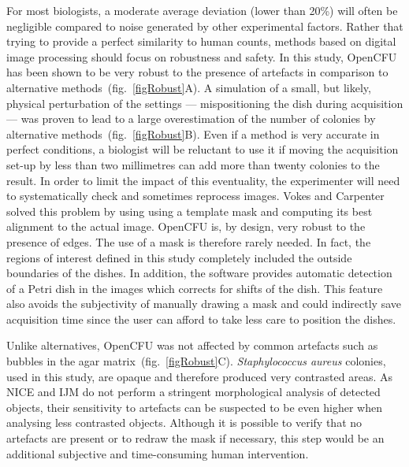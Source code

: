 \documentclass[10pt]{article}
\newcommand{\sa}{\emph{Staphylococcus aureus}}
\newcommand{\IJM}{IJM}
\begin{document}
For most biologists, a moderate average deviation (lower than 20\%) will often be
negligible compared to noise generated by other experimental factors.
Rather that trying to provide a perfect similarity to human counts, methods
based on digital image processing should focus on robustness and safety.
In this study, OpenCFU has been shown to be very robust to the presence of
artefacts in comparison to alternative methods~(fig.~\ref{figRobust}A). A
simulation of a small, but likely, physical perturbation of the settings ---
mispositioning the dish during acquisition --- was proven to lead to a large
overestimation of the number of colonies by alternative
methods~(fig.~\ref{figRobust}B).
Even if a method is very accurate in perfect conditions, a biologist will be
reluctant to use it if moving the acquisition set-up by less than two
millimetres can add more than twenty colonies to the result.
In order to limit the impact of this eventuality, the experimenter will need to
systematically check and sometimes reprocess images.
Vokes and Carpenter \cite{vokes_using_2008} solved this problem by using using a
template mask and computing its best alignment to the actual image.
OpenCFU is, by design, very robust to the presence of edges. The use of a mask is
therefore rarely needed. In fact, the regions of interest defined in this study
completely included the outside boundaries of the dishes.
In addition, the software provides automatic detection of a Petri dish
in
the images which corrects for shifts of the dish. This feature also avoids 
the
subjectivity of manually drawing a mask and could indirectly save acquisition
time since the user can afford to take less care to position the dishes.

Unlike alternatives, OpenCFU was not affected by common artefacts such as bubbles
 in the agar matrix~(fig.~\ref{figRobust}C).  
 \sa{} colonies, used in this study, are opaque and therefore produced very
contrasted areas. As NICE and \IJM{} do not perform a stringent
morphological analysis of detected objects, their sensitivity to artefacts can be
suspected to be even higher when analysing less contrasted objects.
Although 
it is possible to verify that no artefacts are present or to redraw the
mask if necessary, this step would be an additional subjective and
time-consuming human intervention.
\end{document}
